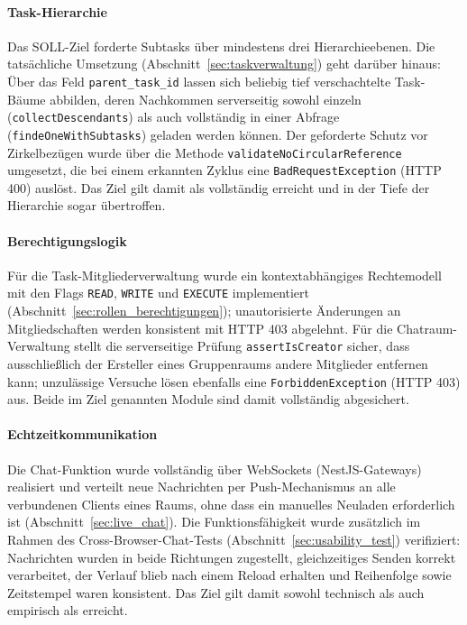 \paragraph{Task-Hierarchie}
Das SOLL-Ziel forderte Subtasks über mindestens drei Hierarchieebenen. Die tatsächliche Umsetzung (Abschnitt~\ref{sec:taskverwaltung}) geht darüber hinaus: Über das Feld \texttt{parent\_task\_id} lassen sich beliebig tief verschachtelte Task-Bäume abbilden, deren Nachkommen serverseitig sowohl einzeln (\texttt{collectDescendants}) als auch vollständig in einer Abfrage (\texttt{findeOneWithSubtasks}) geladen werden können. Der geforderte Schutz vor Zirkelbezügen wurde über die Methode \texttt{validateNoCircularReference} umgesetzt, die bei einem erkannten Zyklus eine \texttt{BadRequestException} (HTTP 400) auslöst. Das Ziel gilt damit als vollständig erreicht und in der Tiefe der Hierarchie sogar übertroffen.

\paragraph{Berechtigungslogik}
Für die Task-Mitgliederverwaltung wurde ein kontextabhängiges Rechtemodell mit den Flags \texttt{READ}, \texttt{WRITE} und \texttt{EXECUTE} implementiert (Abschnitt~\ref{sec:rollen_berechtigungen}); unautorisierte Änderungen an Mitgliedschaften werden konsistent mit HTTP 403 abgelehnt. Für die Chatraum-Verwaltung stellt die serverseitige Prüfung \texttt{assertIsCreator} sicher, dass ausschließlich der Ersteller eines Gruppenraums andere Mitglieder entfernen kann; unzulässige Versuche lösen ebenfalls eine \texttt{ForbiddenException} (HTTP 403) aus. Beide im Ziel genannten Module sind damit vollständig abgesichert.

\paragraph{Echtzeitkommunikation}
Die Chat-Funktion wurde vollständig über WebSockets (NestJS-Gateways) realisiert und verteilt neue Nachrichten per Push-Mechanismus an alle verbundenen Clients eines Raums, ohne dass ein manuelles Neuladen erforderlich ist (Abschnitt~\ref{sec:live_chat}). Die Funktionsfähigkeit wurde zusätzlich im Rahmen des Cross-Browser-Chat-Tests (Abschnitt~\ref{sec:usability_test}) verifiziert: Nachrichten wurden in beide Richtungen zugestellt, gleichzeitiges Senden korrekt verarbeitet, der Verlauf blieb nach einem Reload erhalten und Reihenfolge sowie Zeitstempel waren konsistent. Das Ziel gilt damit sowohl technisch als auch empirisch als erreicht.

